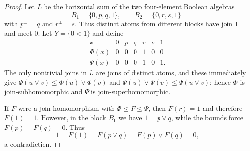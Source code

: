 \documentclass[10pt,a4paper]{amsart}
\newcommand{\join}{\vee}
\begin{document}
\begin{proof}
Let $L$ be the horizontal sum of the two four-element Boolean algebras
\[
B_1=\{0,p,q,1\},\qquad B_2=\{0,r,s,1\},
\]
with $p^\perp=q$ and $r^\perp=s$.
Thus distinct atoms from different blocks have join $1$ and meet $0$.
Let $Y=\{0<1\}$ and define
\[
\begin{array}{c|cccccc}
x&0&p&q&r&s&1\\ \hline
\Phi(x)&0&0&0&1&0&0\\
\Psi(x)&0&0&0&1&0&1.
\end{array}
\]
The only nontrivial joins in $L$ are joins of distinct atoms, and these immediately give
$\Phi(u\join v)\le\Phi(u)\join\Phi(v)$ and
$\Psi(u)\join\Psi(v)\le\Psi(u\join v)$; hence $\Phi$ is join-subhomomorphic and $\Psi$ is join-superhomomorphic.

If $F$ were a join homomorphism with $\Phi\le F\le\Psi$, then $F(r)=1$ and therefore $F(1)=1$.
However, in the block $B_1$ we have $1=p\join q$, while the bounds force $F(p)=F(q)=0$.
Thus
\[
1=F(1)=F(p\join q)=F(p)\join F(q)=0,
\]
a contradiction.
\end{proof}
\end{document}
